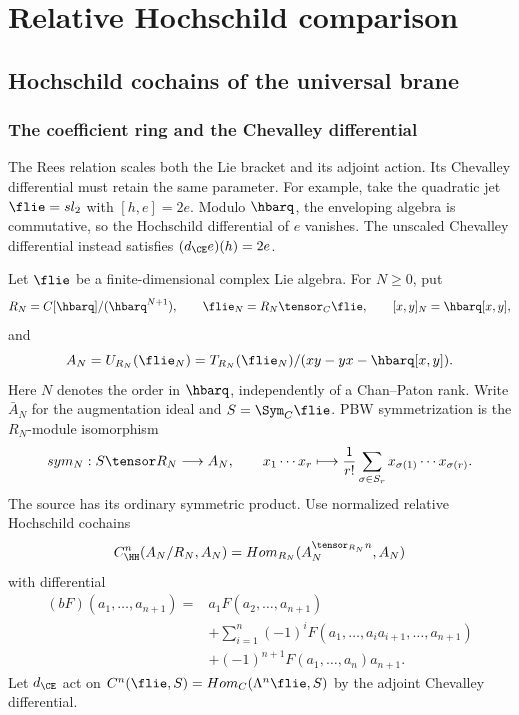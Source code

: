 \part{Relative Hochschild comparison}

\chapter{Hochschild cochains of the universal brane}
\section{The coefficient ring and the Chevalley differential}
The Rees relation scales both the Lie bracket and its adjoint action.
Its Chevalley differential must retain the same parameter.
For example, take the quadratic jet $\flie=\mathfrak{sl}_2$ with
$[h,e]=2e$.  Modulo $\hbarq$, the enveloping algebra is commutative,
so the Hochschild differential of $e$ vanishes.
The unscaled Chevalley differential instead satisfies
$(d_{\CE}e)(h)=2e$.

Let $\flie$ be a finite-dimensional complex Lie algebra.
For $N\ge0$, put
\[
 R_N=\C[\hbarq]/(\hbarq^{N+1}),\qquad
 \flie_N=R_N\tensor_\C\flie,\qquad
 [x,y]_N=\hbarq[x,y],
\]
and
\[
 A_N=U_{R_N}(\flie_N)
 =T_{R_N}(\flie_N)/(xy-yx-\hbarq[x,y]).
\]
Here $N$ denotes the order in $\hbarq$, independently of a Chan--Paton rank.
Write $\bar A_N$ for the augmentation ideal and $S=\Sym_\C\flie$.
PBW symmetrization is the $R_N$-module isomorphism
\[
 \operatorname{sym}_N:S\tensor R_N\longrightarrow A_N,
 \qquad
 x_1\cdots x_r\longmapsto
 \frac1{r!}\sum_{\sigma\in S_r}x_{\sigma(1)}\cdots x_{\sigma(r)}.
\]
The source has its ordinary symmetric product.
Use normalized relative Hochschild cochains
\[
 C^n_{\HH}(A_N/R_N,A_N)
 =\operatorname{Hom}_{R_N}(\bar A_N^{\tensor_{R_N}n},A_N)
\]
with differential
\[
\begin{split}
 (bF)(a_1,\ldots,a_{n+1})
 ={}&a_1F(a_2,\ldots,a_{n+1})\\
 &+\sum_{i=1}^n(-1)^iF(a_1,\ldots,a_i a_{i+1},\ldots,a_{n+1})\\
 &+(-1)^{n+1}F(a_1,\ldots,a_n)a_{n+1}.
\end{split}
\]
Let $d_{\CE}$ act on
$C^n(\flie,S)=\operatorname{Hom}_\C(\Lambda^n\flie,S)$
by the adjoint Chevalley differential.

